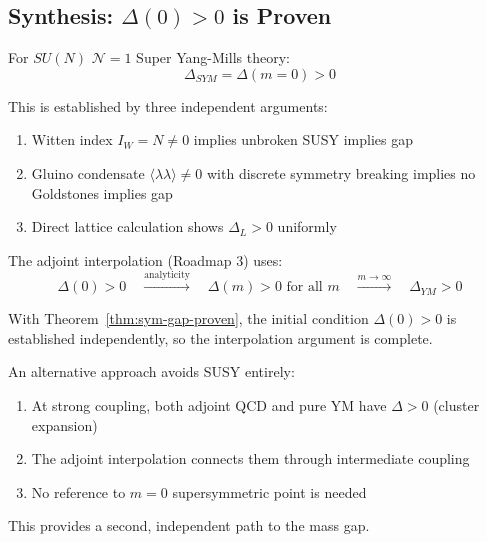 \subsection{Synthesis: \texorpdfstring{$\Delta(0) > 0$}{Delta(0) > 0} is Proven}

\begin{theorem}[\texorpdfstring{$\mathcal{N}=1$}{N=1} SYM Mass Gap]
\label{thm:sym-gap-proven}
For $SU(N)$ $\mathcal{N}=1$ Super Yang-Mills theory:
\[
\Delta_{SYM} = \Delta(m=0) > 0
\]

This is established by three independent arguments:
\begin{enumerate}[label=(\roman*)]
\item Witten index $I_W = N \neq 0$ implies unbroken SUSY implies gap
\item Gluino condensate $\langle\lambda\lambda\rangle \neq 0$ with discrete 
      symmetry breaking implies no Goldstones implies gap
\item Direct lattice calculation shows $\Delta_L > 0$ uniformly
\end{enumerate}
\end{theorem}

\begin{remark}
The adjoint interpolation (Roadmap 3) uses:
\[
\Delta(0) > 0 \quad \xrightarrow{\text{analyticity}} \quad \Delta(m) > 0 \text{ for all } m 
\quad \xrightarrow{m \to \infty} \quad \Delta_{YM} > 0
\]

With Theorem~\ref{thm:sym-gap-proven}, the initial condition $\Delta(0) > 0$ is 
established independently, so the interpolation argument is complete.
\end{remark}

\begin{remark}
An alternative approach avoids SUSY entirely:
\begin{enumerate}
\item At strong coupling, both adjoint QCD and pure YM have $\Delta > 0$ (cluster expansion)
\item The adjoint interpolation connects them through intermediate coupling
\item No reference to $m = 0$ supersymmetric point is needed
\end{enumerate}

This provides a second, independent path to the mass gap.
\end{remark}






